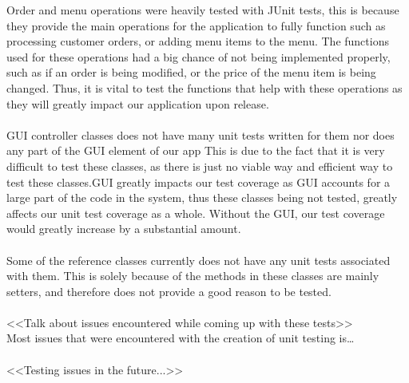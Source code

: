 Order and menu operations were heavily tested with JUnit tests, this is because they provide the main operations for the application to fully function such as processing customer orders, or adding menu items to the menu. The functions used for these operations had a big chance of not being implemented properly, such as if an order is being modified, or the price of the menu item is being changed. Thus, it is vital to test the functions that help with these operations as they will greatly impact our application upon release.\\ \\
GUI controller classes does not have many unit tests written for them nor does any part of the GUI element of our app This is due to the fact that it is very difficult to test these classes, as there is just no viable way and efficient way to test these classes.GUI greatly impacts our test coverage as GUI accounts for a large part of the code in the system, thus these classes being not tested, greatly affects our unit test coverage as a whole. Without the GUI, our test coverage would greatly increase by a substantial amount.\\ \\
Some of the reference classes currently does not have any unit tests associated with them. This is solely because of the methods in these classes are mainly setters, and therefore does not provide a good reason to be tested. \\ \\

<<Talk about issues encountered while coming up with these tests>>\\
Most issues that were encountered with the creation of unit testing is…\\ \\ 
<<Testing issues in the future...>>
